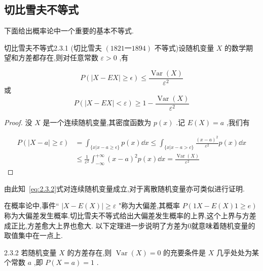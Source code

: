 \subsection{切比雪夫不等式}\label{sec:2.3.3}

下面给出概率论中一个重要的基本不等式.

\begin{theorem}{切比雪夫不等式}{2.3.1}
	(切比雪夫 $ (1821一1894) $ 不等式)设随机变量 $ X $ 的数学期望和方差都存在,则对任意常数 $ \varepsilon>0 $ ,有
	
	\begin{equation}
	P(|X-E X| \geqslant \epsilon) \leqslant \frac{\operatorname{Var}(X)}{\varepsilon^{2}} \label{eq:2.3.2}
	\end{equation}
	或
	\begin{equation}
	P(|X-E X|<\varepsilon) \geqslant 1-\frac{\operatorname{Var}(X)}{\varepsilon^{2}} \label{eq:2.3.3}
	\end{equation}
\end{theorem}

\begin{proof}
	没 $ X $ 是一个连续随机变量,其密度函数为 $ p(x) $ .记 $ E(X)=a $ ,我们有
	
	\[
	\begin{array}{ll}
	{P(|X-a| \geqslant \varepsilon)} & {=\int_{\{x | x-a \geq \epsilon\}} p(x) \dd x \leq \int_{\{x | x-a>c\}} \frac{(x-a)^{2}}{\varepsilon^{2}} p(x) \dd x} \\ 
	{} & {\leqslant \frac{1}{\varepsilon^{2}} \int_{-\infty}^{+\infty}(x-a)^{2} p(x) \dd x=\frac{\operatorname{Var}(X)}{\varepsilon^{2}}}
	\end{array}
	\] 
\end{proof}

由此知~\ref{eq:2.3.2}式对连续随机变量成立,对于离散随机变量亦可类似进行证明.

在概率论中,事件`` $ |X-E(X)| \geqslant \varepsilon $ "称为大偏差,其概率 $ P(1X-E(X)1 \geqslant e) $ 称为大偏差发生概率.切比雪夫不等式给出大偏差发生概率的上界,这个上界与方差成正比,方差愈大上界也愈大.
以下定理进一步说明了方差为0就意味着随机变量的取值集中在一点上.

\begin{theorem}{}{2.3.2}
	若随机变量 $ X $ 的方差存在,则 $ \operatorname{Var}(X)=0 $ 的充要条件是 $ X $ 几乎处处为某个常数 $ a $ ,即 $ P(X=a)=1 $ .
\end{theorem}

